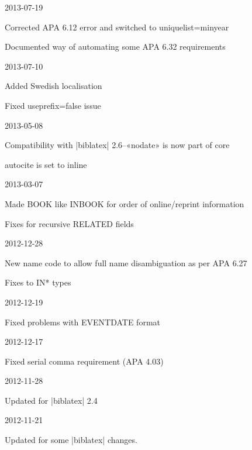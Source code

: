 \documentclass{ltxdockit}
\begin{document}
\begin{changelog}

\begin{release}{6.1}{2013-07-19}
\item Corrected APA 6.12 error and switched to uniquelist=minyear
\item Documented way of automating some APA 6.32 requirements
\end{release}

\begin{release}{6.0}{2013-07-10}
\item Added Swedish localisation
\item Fixed useprefix=false issue
\end{release}

\begin{release}{5.9}{2013-05-08}
\item Compatibility with |biblatex| 2.6--«nodate» is now part of core
\item autocite is set to inline
\end{release}

\begin{release}{5.8}{2013-03-07}
\item Made BOOK like INBOOK for order of online/reprint information
\item Fixes for recursive RELATED fields
\end{release}

\begin{release}{5.7}{2012-12-28}
\item New name code to allow full name disambiguation as per APA 6.27
\item Fixes to IN* types
\end{release}

\begin{release}{5.6}{2012-12-19}
\item Fixed problems with EVENTDATE format
\end{release}

\begin{release}{5.5}{2012-12-17}
\item Fixed serial comma requirement (APA 4.03)
\end{release}

\begin{release}{5.4}{2012-11-28}
\item Updated for |biblatex| 2.4
\end{release}

\begin{release}{5.3}{2012-11-21}
\item Updated for some |biblatex| changes.
\end{release}


\end{changelog}
\end{document}
